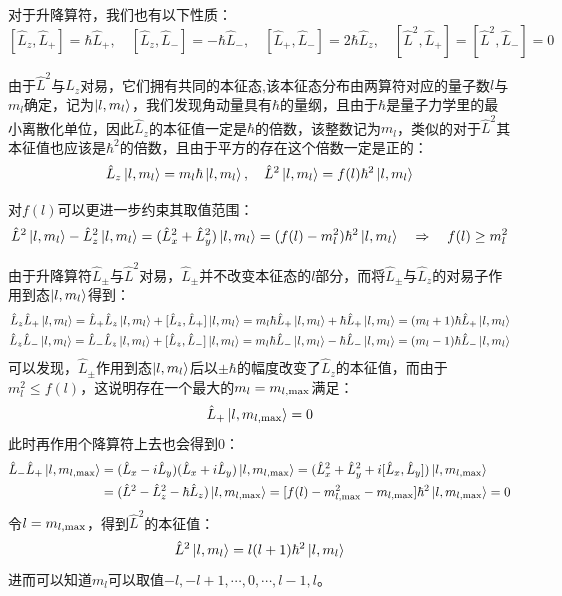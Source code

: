对于升降算符，我们也有以下性质：
\[[\hat{L}_z,\hat{L}_+]=\hbar\hat{L}_+, \quad [\hat{L}_z,\hat{L}_-]=-\hbar\hat{L}_-, \quad [\hat{L}_+,\hat{L}_-]=2\hbar\hat{L}_z, \quad [\hat{L}^2,\hat{L}_+]=[\hat{L}^2,\hat{L}_-]=0\]

由于$\hat{L}^2$与$\hat{L}_z$对易，它们拥有共同的本征态,该本征态分布由两算符对应的量子数$l$与$m_l$确定，记为$\ket{l,m_l}$，我们发现角动量具有$\hbar$的量纲，且由于$\hbar$是量子力学里的最小离散化单位，因此$\hat{L}_z$的本征值一定是$\hbar$的倍数，该整数记为$m_l$，类似的对于$\hat{L}^2$其本征值也应该是$\hbar^2$的倍数，且由于平方的存在这个倍数一定是正的：
\[\hat{L}_z\ket{l,m_l}=m_l\hbar\ket{l,m_l}, \quad \hat{L}^2\ket{l,m_l}=f(l)\hbar^2\ket{l,m_l}\]

对$f(l)$可以更进一步约束其取值范围：
\[\hat{L}^2\ket{l,m_l}-\hat{L}_z^2\ket{l,m_l}=(\hat{L}_x^2+\hat{L}_y^2)\ket{l,m_l}=(f(l)-m_l^2)\hbar^2\ket{l,m_l} \quad \Rightarrow \quad f(l) \geq m_l^2\]

由于升降算符$\hat{L}_{\pm}$与$\hat{L}^2$对易，$\hat{L}_{\pm}$并不改变本征态的$l$部分，而将$\hat{L}_{\pm}$与$\hat{L}_z$的对易子作用到态$\ket{l,m_l}$得到：
\begin{equation}
\begin{aligned}\label{lpm}
\hat{L}_z\hat{L}_+\ket{l,m_l}=\hat{L}_+\hat{L}_z\ket{l,m_l}+[\hat{L}_z,\hat{L}_+]\ket{l,m_l}=m_l\hbar\hat{L}_+\ket{l,m_l}+\hbar\hat{L}_+\ket{l,m_l}=(m_l+1)\hbar\hat{L}_+\ket{l,m_l} \\ \hat{L}_z\hat{L}_-\ket{l,m_l}=\hat{L}_-\hat{L}_z\ket{l,m_l}+[\hat{L}_z,\hat{L}_-]\ket{l,m_l}=m_l\hbar\hat{L}_-\ket{l,m_l}-\hbar\hat{L}_-\ket{l,m_l}=(m_l-1)\hbar\hat{L}_-\ket{l,m_l}
\end{aligned}    
\end{equation}
可以发现，$\hat{L}_{\pm}$作用到态$\ket{l,m_l}$后以$\pm\hbar$的幅度改变了$\hat{L}_z$的本征值，而由于$m_l^2 \leq f(l)$，这说明存在一个最大的$m_l=m_{l,\rm{max}}$满足：
\[\hat{L}_+\ket{l,m_{l,\rm{max}}}=0\]
此时再作用个降算符上去也会得到0：
\begin{equation}
\begin{aligned}\label{l2pm}
\hat{L}_-\hat{L}_+\ket{l,m_{l,\rm{max}}}&=(\hat{L}_x-i\hat{L}_y)(\hat{L}_x+i\hat{L}_y)\ket{l,m_{l,\rm{max}}}=(\hat{L}_x^2+\hat{L}_y^2+i[\hat{L}_x,\hat{L}_y])\ket{l,m_{l,\rm{max}}}\\
&=(\hat{L}^2-\hat{L}_z^2-\hbar\hat{L}_z)\ket{l,m_{l,\rm{max}}}=[f(l)-m_{l,\rm{max}}^2-m_{l,\rm{max}}]\hbar^2\ket{l,m_{l,\rm{max}}}=0
\end{aligned}
\end{equation}
令$l=m_{l,\rm{max}}$，得到$\hat{L}^2$的本征值：
\[\hat{L}^2\ket{l,m_l}=l(l+1)\hbar^2\ket{l,m_l}\]
进而可以知道$m_l$可以取值$-l,-l+1,\cdots,0,\cdots,l-1,l$。


